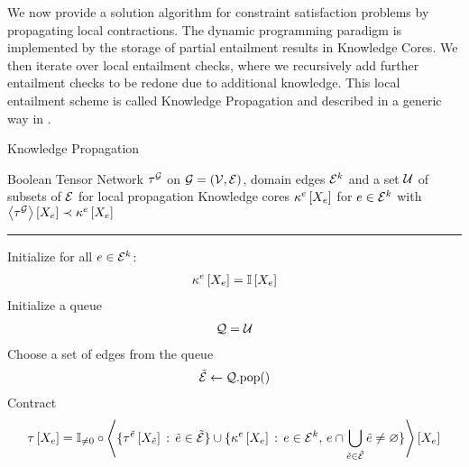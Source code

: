 
We now provide a solution algorithm for constraint satisfaction problems by propagating local contractions.
The dynamic programming paradigm is implemented by the storage of partial entailment results in Knowledge Cores.
We then iterate over local entailment checks, where we recursively add further entailment checks to be redone due to additional knowledge.
This local entailment scheme is called Knowledge Propagation and described in a generic way in .

\begin{algorithm}[hbt!]
    \caption{Knowledge Propagation}\label{alg:knowledgePropagation}
    \begin{algorithmic}
        \Require Boolean Tensor Network $\tau^{\mathcal{G}}$ on $\mathcal{G}=(\mathcal{V},\mathcal{E})$, domain edges $\mathcal{E}^{k}$ and a set $\mathcal{U}$ of subsets of $\mathcal{E}$ for local propagation
        \Ensure Knowledge cores $\kappa^{e}\left[X_{e}\right]$ for $e\in\mathcal{E}^{k}$ with $\left\langle \tau^{\mathcal{G}}\right\rangle \left[ X_{e} \right]\prec\kappa^{e}\left[X_{e}\right]$
        \hrule
        \State
        \State Initialize for all $e\in\mathcal{E}^{k}$:
        \begin{align*}
            \kappa^{e}\left[X_{e}\right]=\mathbb{I}\left[X_{e}\right]
        \end{align*}
        \State Initialize a queue
        \begin{align*}
            \mathcal{Q} = \mathcal{U}
        \end{align*}
            \State Choose a set of edges from the queue
            \begin{align*}
                \tilde{\mathcal{E}} \leftarrow \mathcal{Q}\mathrm{.pop()}
            \end{align*}
                \State Contract
                \begin{align*}
                    \hypercoreat{\catvariableof{\edge}}
                    = \nonzerocirc\contractionof{
                        \{\hypercoreofat{\secedge}{\catvariableof{\secedge}}\wcols\secedge\in\secedges\}
                        \cup \{\kcoreofat{\edge}{\catvariableof{\edge}}\wcols\edge \in \domainedges , \, \edge\cap\bigcup_{\secedge\in\secedges}\secedge\neq\varnothing \}
                    }{\catvariableof{\edge}}

\end{align*}
\end{algorithmic}
\end{algorithm}
